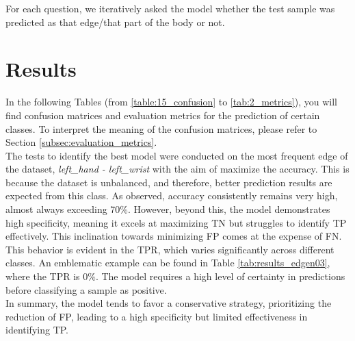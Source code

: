 For each question, we iteratively asked the model whether the test sample was predicted as that edge/that part of the body or not.

\section{Results}
In the following Tables (from \ref{table:15_confusion} to \ref{tab:2_metrics}), you will find confusion matrices and evaluation metrics for the prediction of certain classes.
To interpret the meaning of the confusion matrices, please refer to Section \ref{subsec:evaluation_metrics}.
\\

The tests to identify the best model were conducted on the most frequent edge of the dataset, \textit{left\_hand - left\_wrist} with the aim of maximize the accuracy.
This is because the dataset is unbalanced, and therefore, better prediction results are expected from this class.
As observed, accuracy consistently remains very high, almost always exceeding 70\%.
However, beyond this, the model demonstrates high specificity, meaning it excels at maximizing TN but struggles to identify TP effectively.
This inclination towards minimizing FP comes at the expense of FN.
This behavior is evident in the TPR, which varies significantly across different classes.
An emblematic example can be found in Table \ref{tab:results_edgen03}, where the TPR is 0\%.
The model requires a high level of certainty in predictions before classifying a sample as positive. \\
In summary, the model tends to favor a conservative strategy, prioritizing the reduction of FP, leading to a high specificity but limited effectiveness in identifying TP.


